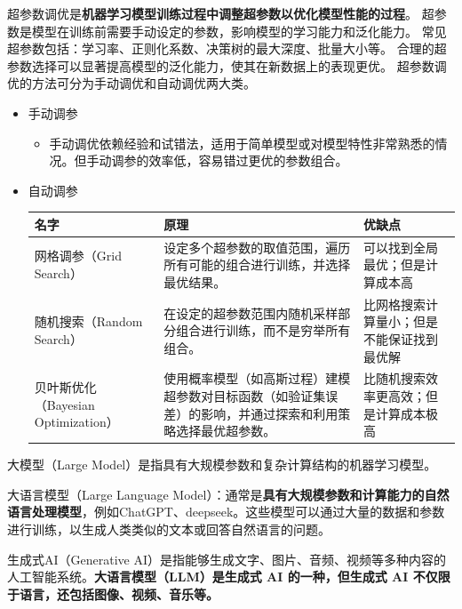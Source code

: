 \documentclass[12pt]{article}
\begin{document}
超参数调优是\textbf{机器学习模型训练过程中调整超参数以优化模型性能的过程}。
超参数是模型在训练前需要手动设定的参数，影响模型的学习能力和泛化能力。
常见超参数包括：学习率、正则化系数、决策树的最大深度、批量大小等。
合理的超参数选择可以显著提高模型的泛化能力，使其在新数据上的表现更优。
超参数调优的方法可分为手动调优和自动调优两大类。
\begin{itemize}
    \item 手动调参
          \begin{itemize}
              \item 手动调优依赖经验和试错法，适用于简单模型或对模型特性非常熟悉的情况。但手动调参的效率低，容易错过更优的参数组合。
          \end{itemize}
    \item 自动调参
          \begin{table}[h]
              \centering
              \begin{tabular}{|p{3cm}|p{5cm}|p{5cm}|} %
                \hline
                \textbf{名字} & \textbf{原理} & \textbf{优缺点} \\ 
                \hline
                  网格调参（Grid Search） & 设定多个超参数的取值范围，遍历所有可能的组合进行训练，并选择最优结果。 & 可以找到全局最优；但是计算成本高 \\
                  \hline
                  随机搜索（Random Search） & 在设定的超参数范围内随机采样部分组合进行训练，而不是穷举所有组合。 & 比网格搜索计算量小；但是不能保证找到最优解 \\
                  \hline
                  贝叶斯优化（Bayesian Optimization） & 使用概率模型（如高斯过程）建模超参数对目标函数（如验证集误差）的影响，并通过探索和利用策略选择最优超参数。 & 比随机搜索效率更高效；但是计算成本极高 \\
                  \hline
              \end{tabular}
          \end{table}

\end{itemize}

\noindent{}
大模型（Large Model）是指具有大规模参数和复杂计算结构的机器学习模型。

大语言模型（Large Language Model）：通常是\textbf{具有大规模参数和计算能力的自然语言处理模型}，例如ChatGPT、deepseek。这些模型可以通过大量的数据和参数进行训练，以生成人类类似的文本或回答自然语言的问题。

生成式AI（Generative AI）是指能够生成文字、图片、音频、视频等多种内容的人工智能系统。\textbf{大语言模型（LLM）是生成式 AI 的一种，但生成式 AI 不仅限于语言，还包括图像、视频、音乐等。}
\end{document}
